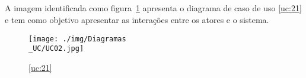 \subsection{}
A imagem identificada como figura~\ref{fig:chap212} apresenta o diagrama de caso de uso \ref{uc:21} e tem como objetivo apresentar as interações entre os atores e o sistema.

\vspace*{5mm}

\begin{figure}[H]
	\centering
	\texttt{[image: ./img/Diagramas\\\_UC/UC02.jpg]}  %
	\caption{\ref{uc:21}}
	\label{fig:chap212}
\end{figure}

\newpage

